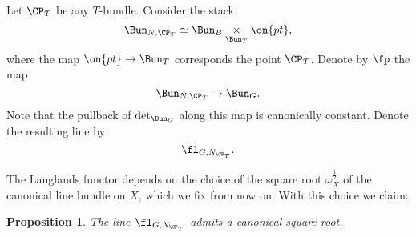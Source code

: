 \documentclass[9pt]{amsart}
\newtheorem{prop}[subsubsection]{Proposition}
\theoremstyle{remark}
\theoremstyle{definition}
\theoremstyle{remark}
\newcommand{\secref}[1]{Sect.~\ref{#1}}
\numberwithin{equation}{section}
\begin{document}
\sssec{} \label{sss:crit to BunN}

Let $\CP_T$ be any $T$-bundle. Consider the stack
$$\Bun_{N,\CP_T}\simeq \Bun_B\underset{\Bun_T}\times \on{pt},$$
where the map $\on{pt}\to \Bun_T$ corresponds the point $\CP_T$. Denote by $\fp$ the map
$$\Bun_{N,\CP_T}\to \Bun_G.$$
Note that the pullback of $\det_{\Bun_G}$ along this map is canonically constant. 
Denote the resulting line by
$$\fl_{G,N_{\CP_T}}.$$

\sssec{}

The Langlands functor depends on the choice of the square root $\omega_X^{\frac{1}{2}}$
of the canonical line bundle on $X$, which we fix from now on. With this choice we claim:

\begin{prop} \label{p:det to BunN}
The line $\fl_{G,N_{\CP_T}}$ admits a canonical %
square root. 
\end{prop}
\end{document}
